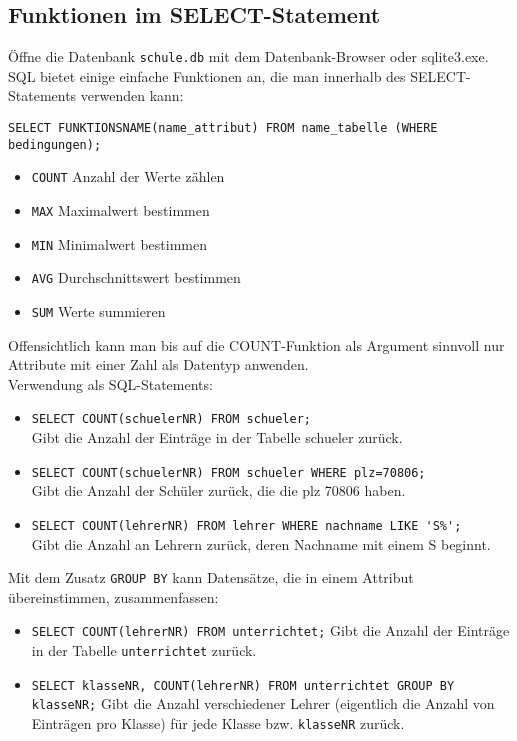 \subsection[Funktionen]{Funktionen im SELECT-Statement}\label{funktionen}
Öffne die Datenbank \texttt{schule.db} mit dem Datenbank-Browser oder sqlite3.exe.\\
SQL bietet einige einfache Funktionen an, die man innerhalb des SELECT-Statements verwenden kann:
\begin{tcolorbox}[title=Funktionen in SQL]
	\lstinline!SELECT FUNKTIONSNAME(name_attribut) FROM name_tabelle (WHERE bedingungen);!
\end{tcolorbox}
\begin{itemize}
	\item \lstinline!COUNT!	Anzahl der Werte zählen
	\item \lstinline!MAX!	Maximalwert bestimmen
	\item \lstinline!MIN!	Minimalwert bestimmen
	\item \lstinline!AVG!	Durchschnittswert bestimmen
	\item \lstinline!SUM!	Werte summieren
\end{itemize}

Offensichtlich kann man bis auf die COUNT-Funktion als Argument sinnvoll nur Attribute mit einer Zahl als Datentyp anwenden.\\
Verwendung als SQL-Statements:
\begin{itemize}
	\item \lstinline!SELECT COUNT(schuelerNR) FROM schueler;!\\
	Gibt die Anzahl der Einträge in der Tabelle schueler zurück.
	\item \lstinline!SELECT COUNT(schuelerNR) FROM schueler WHERE plz=70806;!\\
	Gibt die Anzahl der Schüler zurück, die die plz 70806 haben.
	\item \lstinline!SELECT COUNT(lehrerNR) FROM lehrer WHERE nachname LIKE 'S%';!\\
	Gibt die Anzahl an Lehrern zurück, deren Nachname mit einem S beginnt.
\end{itemize}
Mit dem Zusatz \lstinline!GROUP BY! kann Datensätze, die in einem Attribut übereinstimmen, zusammenfassen:
\begin{itemize}
	\item \lstinline!SELECT COUNT(lehrerNR) FROM unterrichtet;!
	Gibt die Anzahl der Einträge in der Tabelle \lstinline!unterrichtet! zurück.
	\item \lstinline!SELECT klasseNR, COUNT(lehrerNR) FROM unterrichtet GROUP BY klasseNR;!
	Gibt die Anzahl verschiedener Lehrer (eigentlich die Anzahl von Einträgen pro Klasse) für jede Klasse bzw. \lstinline!klasseNR! zurück.
\end{itemize}

